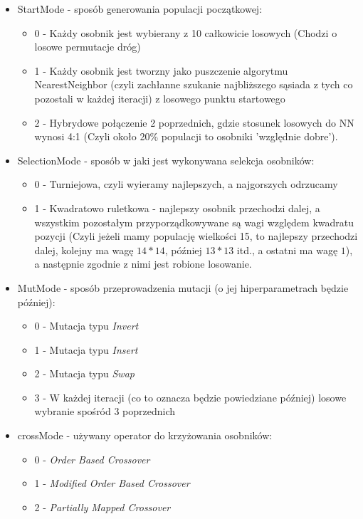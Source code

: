 \documentclass{article}
\begin{document}
\begin{itemize}
	\item StartMode - sposób generowania populacji początkowej:
		\begin{itemize}
			\item 0 - Każdy osobnik jest wybierany z 10 całkowicie losowych (Chodzi o losowe permutacje dróg)
			\item 1 - Każdy osobnik jest tworzny jako puszczenie algorytmu NearestNeighbor (czyli zachłanne szukanie najbliższego sąsiada z tych co pozostali w każdej iteracji) z losowego punktu startowego
			\item 2 - Hybrydowe połączenie 2 poprzednich, gdzie stosunek losowych do NN wynosi 4:1 (Czyli około 20\% populacji to osobniki 'względnie dobre').
		\end{itemize}

	\item SelectionMode - sposób w jaki jest wykonywana selekcja osobników:
		\begin{itemize}
			\item 0 - Turniejowa, czyli wyieramy najlepszych, a najgorszych odrzucamy
			\item 1 - Kwadratowo ruletkowa - najlepszy osobnik przechodzi dalej, a wszystkim pozostałym przyporządkowywane są wagi względem kwadratu pozycji (Czyli jeżeli mamy populację wielkości 15, to najlepszy przechodzi dalej, kolejny ma wagę $14*14$, później $13*13$ itd., a ostatni ma wagę $1$), a następnie zgodnie z nimi jest robione losowanie.
		\end{itemize}

	\item MutMode - sposób przeprowadzenia mutacji (o jej hiperparametrach będzie później):
		\begin{itemize}
			\item 0 - Mutacja typu \textit{Invert}
			\item 1 - Mutacja typu \textit{Insert}
			\item 2 - Mutacja typu \textit{Swap}
			\item 3 - W każdej iteracji (co to oznacza będzie powiedziane później) losowe wybranie spośród 3 poprzednich
		\end{itemize}

	\item crossMode	- używany operator do krzyżowania osobników:
		\begin{itemize}
			\item 0 - \textit{Order Based Crossover}
			\item 1 - \textit{Modified Order Based Crossover}
			\item 2 - \textit{Partially Mapped Crossover}
		\end{itemize}


\end{itemize}
\end{document}
